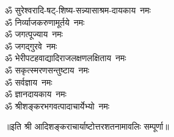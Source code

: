 \begin{multicols}{2}
\begin{flushleft}
        ॐ सुरेश्वरादि-षट्-शिष्य-सन्न्यासाश्रम-दायकाय~नमः\\
        ॐ निर्व्याजकरुणामूर्तये~नमः\\
        ॐ जगत्पूज्याय~नमः\\
        ॐ जगद्गुरवे~नमः\\
        ॐ भेरी\-पटह\-वाद्यादि\-राजलक्षण\-लक्षिताय~नमः\\
        ॐ सकृत्स्मरणसन्तुष्टाय~नमः\\
        ॐ सर्वज्ञाय~नमः\\
        ॐ ज्ञानदायकाय~नमः\hfill{}\\
        ॐ श्रीशङ्करभगवत्पादाचार्येभ्यो~नमः\\
                                                                                
    \end{flushleft}
\end{multicols}
॥इति श्री आदिशङ्कराचार्याष्टोत्तरशतनामावलिः  सम्पूर्णा॥
